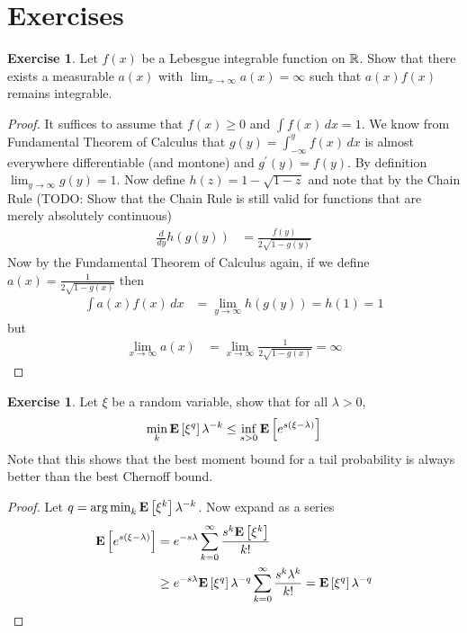\documentclass{amsart}
\DeclareMathOperator*{\argmin}{arg\,min}
\theoremstyle{remark}
\theoremstyle{definition}
\newtheorem{ex}[thm]{Exercise}
\begin{document}








\section{Exercises}
\begin{ex}Let $f(x)$ be a Lebesgue integrable function on $\mathbb{R}$.
  Show that there exists a measurable $a(x)$ with $\lim_{x \to \infty}
  a(x) = \infty$ such that $a(x)f(x)$ remains integrable.
\end{ex}
\begin{proof}
It suffices to assume that $f(x) \geq 0$ and $\int f(x) \, dx = 1$.
We know from Fundamental Theorem of Calculus that $g(y) = \int_{-\infty}^y
f(x) \, dx$ is almost everywhere differentiable (and montone) and
$g^\prime(y) = f(y)$.   By
definition $\lim_{y \to \infty} g(y) = 1$.  Now define $h(z) = 1 -
\sqrt{1 -z}$ and note that by the Chain Rule (TODO: Show that the
Chain Rule is still valid for functions that are merely absolutely continuous)
\begin{align*}
\frac{d}{dy} h(g(y)) &= \frac{f(y)}{2 \sqrt{1 - g(y)}}
\end{align*}
Now by the Fundamental Theorem of Calculus again, if we define $a(x) =
\frac{1}{2 \sqrt{1 - g(x)}}$ 
then 
\begin{align*}
\int a(x) f(x) \, dx &= \lim_{y \to \infty} h(g(y)) = h(1) = 1
\end{align*}
but 
\begin{align*}
\lim_{x \to \infty} a(x) &= \lim_{x \to \infty} \frac{1}{2 \sqrt{1 -
    g(x)}} = \infty
\end{align*}
\end{proof}
\begin{ex}Let $\xi$ be a random variable, show that for all $\lambda > 0$,
\begin{align*}
\min_k \textbf{E}\left[\xi^q\right] \lambda^{-k} \leq \inf_{s>0} \textbf{E}\left[e^{s(\xi-\lambda)}\right]
\end{align*}
Note that this shows that the best moment bound for a tail
probability is always better than the best Chernoff bound.
\end{ex}
\begin{proof}
Let $q = \argmin_k \expectation{\xi^k} \lambda^{-k}$.  Now expand as a
series
\begin{align*}
\textbf{E}\left[e^{s(\xi-\lambda)}\right] &= e^{-s\lambda} \sum_{k=0}^\infty
\frac{s^k \textbf{E}\left[\xi^k\right]}{k!} \\
& \geq e^{-s\lambda} \textbf{E}\left[\xi^q\right] \lambda^{-q} \sum_{k=0}^\infty
\frac{s^k \lambda^k}{k!} = \textbf{E}\left[\xi^q\right] \lambda^{-q}
\end{align*}
\end{proof}
\end{document}
